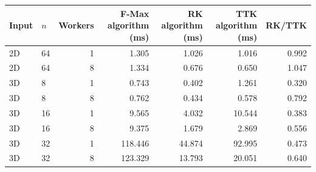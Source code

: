 \begin{tabular}{llrrrrr}
\hline
Input & $n$ & Workers & F-Max algorithm (ms) & RK algorithm (ms) & TTK algorithm (ms) & RK/TTK \\
\hline
2D & 64 & 1 & 1.305 & 1.026 & 1.016 & 0.992 \\
2D & 64 & 8 & 1.334 & 0.676 & 0.650 & 1.047 \\
3D & 8 & 1 & 0.743 & 0.402 & 1.261 & 0.320 \\
3D & 8 & 8 & 0.762 & 0.434 & 0.578 & 0.792 \\
3D & 16 & 1 & 9.565 & 4.032 & 10.544 & 0.383 \\
3D & 16 & 8 & 9.375 & 1.679 & 2.869 & 0.556 \\
3D & 32 & 1 & 118.446 & 44.874 & 92.995 & 0.473 \\
3D & 32 & 8 & 123.329 & 13.793 & 20.051 & 0.640 \\
\hline
\end{tabular}
